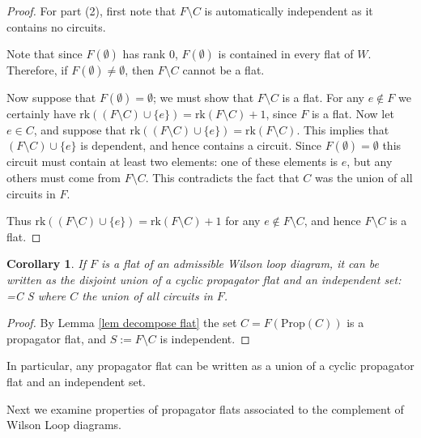 \documentclass[11pt]{article}
\newcommand{\rk}{\textrm{rk} }
\def\bas #1\eas{\begin{align*} #1 \end{align*}}
\newcommand{\Prop}{\textrm{Prop}}
\newtheorem{cor}[thm]{Corollary}
\theoremstyle{remark}
\theoremstyle{definition}
\begin{document}
\begin{proof}
For part (2), first note that $F \setminus C$ is automatically independent as it contains no circuits.

Note that since $F(\emptyset)$ has rank $0$, $F(\emptyset)$ is contained in every flat of $W$. Therefore, if $F(\emptyset) \neq \emptyset$, then $F\setminus C$ cannot be a flat. 

Now suppose that $F(\emptyset) = \emptyset$; we must show that $F\setminus C$ is a flat. For any $e \not\in F$ we certainly have $\rk((F\setminus C)\cup\{e\}) = \rk(F\setminus C) +1$, since $F$ is a flat. Now let $e \in C$, and suppose that $\rk((F\setminus C)\cup\{e\}) = \rk(F\setminus C)$. This implies that $(F\setminus C)\cup \{e\}$ is dependent, and hence contains a circuit. Since $F(\emptyset) = \emptyset$ this circuit must contain at least two elements: one of these elements is $e$, but any others must come from $F \setminus C$. This contradicts the fact that $C$ was the union of all circuits in $F$. 

Thus $\rk((F\setminus C)\cup \{e\}) = \rk(F\setminus C) + 1$ for any $e \not\in F\setminus C$, and hence $F\setminus C$ is a flat.
\end{proof}

\begin{cor} \label{classifyflats}
  If $F$ is a flat of an admissible Wilson loop diagram, it can be written as the disjoint union of a cyclic propagator flat and an independent set: \bas F =C \sqcup S \eas where $C$ the union of all circuits in $F$. \end{cor}
 
\begin{proof}
By Lemma \ref{lem decompose flat} the set $C = F(\Prop(C))$ is a propagator flat, and $S := F \setminus C$ is independent.
\end{proof}

In particular, any propagator flat can be written as a union of a cyclic propagator flat and an independent set.

Next we examine properties of propagator flats associated to the complement of Wilson Loop diagrams.

\end{document}
